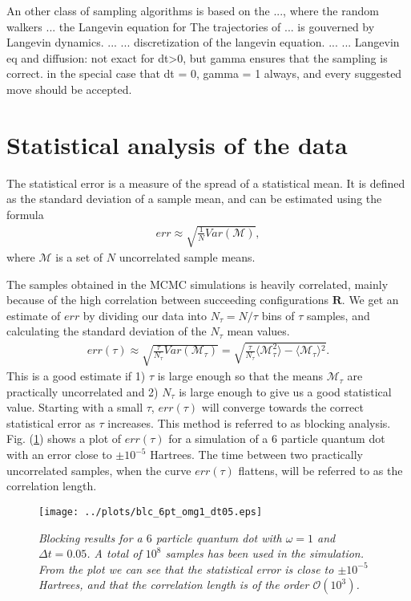 \documentclass[a4paper,10pt,twocolumn]{article} %
\newcommand{\ts}[1]{\textbf{#1}}
\newcommand{\expec}[1]{\langle{}{#1}\rangle{}}
\begin{document}
An other class of sampling algorithms is based on the ..., where the random walkers ... the Langevin equation for 
The trajectories of ... is gouverned by Langevin dynamics. 
...
...
discretization of the langevin equation.
...
...
Langevin eq and diffusion: not exact for dt>0, but gamma ensures that the sampling is correct. in the special case that 
dt = 0, gamma = 1 always, and every suggested move should be accepted. 


\section{Statistical analysis of the data}%

The statistical error is a measure of the spread of a statistical mean.
It is defined as the standard deviation of a sample mean, and can be estimated using the formula \cite{m.h-j}
\begin{align}
		err\approx\sqrt{\frac1{N}Var(\mathcal M)},
\end{align}
where $\mathcal M$ is a set of $N$ uncorrelated sample means.  

The samples obtained in the MCMC simulations is heavily correlated, mainly because of the high correlation between succeeding configurations $\ts R$.
We get an estimate of $err$ by dividing our data into $N_\tau=N/\tau$ bins of $\tau$ samples, and calculating the standard deviation of the $N_\tau$ mean values. 
\begin{align}
	err(\tau)\approx\sqrt{\frac\tau{N_\tau}Var(\mathcal M_\tau)} = \sqrt{\frac{\tau}{N_\tau}\expec{\mathcal M_\tau^2}-\expec{\mathcal M_\tau}^2}.
\end{align}
This is a good estimate if 1) $\tau$ is large enough so that the means $\mathcal M_\tau$ are practically uncorrelated and 2) $N_\tau$ is large enough 
to give us a good statistical value. Starting with a small $\tau$, $err(\tau)$ will converge towards the correct statistical error as $\tau$ increases. 
This method is referred to as blocking analysis. Fig. (\ref{figblc}) shows a plot of $err(\tau)$ for a simulation of a $6$ particle quantum dot with an error
close to $\pm10^{-5}$ Hartrees. The time between two practically uncorrelated samples, when the curve $err(\tau)$ flattens, will be referred to as the correlation length.


\begin{figure}[h!]
\begin{center}
\caption{{\it%
		Blocking results for a $6$ particle quantum dot with $\omega=1$ and $\Delta t = 0.05$. A total of $10^8$ samples has been used in the simulation. From the plot we can see that
		the statistical error is close to $\pm10^{-5}$ Hartrees, and that the correlation length is of the order $\mathcal O(10^3)$.}} 
		\label{figblc}
	\texttt{[image: ../plots/blc\_6pt\_omg1\_dt05.eps]}
\end{center}
\vspace{-1.2cm}
\end{figure}
\end{document}

